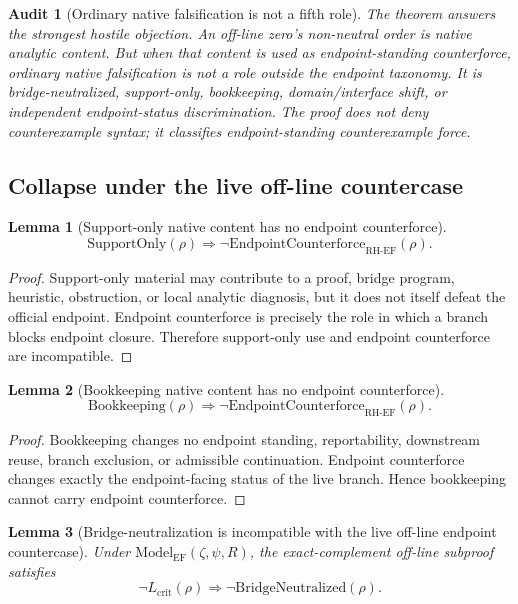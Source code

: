 \documentclass[11pt]{article}
\newtheorem{lemma}{Lemma}[section]
\newtheorem{audit}{Audit}[section]
\newcommand{\Lcrit}{L_{\mathrm{crit}}}
\newcommand{\RH}{\mathrm{RH}}
\newcommand{\EF}{\mathrm{EF}}
\newcommand{\ModelEF}{\mathrm{Model}_{\mathrm{EF}}}
\newcommand{\Counterforce}{\mathrm{EndpointCounterforce}}
\newcommand{\Book}{\mathrm{Bookkeeping}}
\newcommand{\Support}{\mathrm{SupportOnly}}
\newcommand{\BridgeNeutralized}{\mathrm{BridgeNeutralized}}
\begin{document}
\begin{audit}[Ordinary native falsification is not a fifth role]
The theorem answers the strongest hostile objection.  An off-line zero's non-neutral order is native analytic content.  But when that content is used as endpoint-standing counterforce, ordinary native falsification is not a role outside the endpoint taxonomy.  It is bridge-neutralized, support-only, bookkeeping, domain/interface shift, or independent endpoint-status discrimination.  The proof does not deny counterexample syntax; it classifies endpoint-standing counterexample force.
\end{audit}

\subsection{Collapse under the live off-line countercase}

\begin{lemma}[Support-only native content has no endpoint counterforce]
\[
\Support(\rho)\Rightarrow \neg\Counterforce_{\RH\text{-}\EF}(\rho).
\]
\end{lemma}

\begin{proof}
Support-only material may contribute to a proof, bridge program, heuristic, obstruction, or local analytic diagnosis, but it does not itself defeat the official endpoint.  Endpoint counterforce is precisely the role in which a branch blocks endpoint closure.  Therefore support-only use and endpoint counterforce are incompatible.
\end{proof}

\begin{lemma}[Bookkeeping native content has no endpoint counterforce]
\[
\Book(\rho)\Rightarrow \neg\Counterforce_{\RH\text{-}\EF}(\rho).
\]
\end{lemma}

\begin{proof}
Bookkeeping changes no endpoint standing, reportability, downstream reuse, branch exclusion, or admissible continuation.  Endpoint counterforce changes exactly the endpoint-facing status of the live branch.  Hence bookkeeping cannot carry endpoint counterforce.
\end{proof}

\begin{lemma}[Bridge-neutralization is incompatible with the live off-line endpoint countercase]
Under \(\ModelEF(\zeta,\psi,R)\), the exact-complement off-line subproof satisfies
\[
\neg\Lcrit(\rho)\Rightarrow \neg\BridgeNeutralized(\rho).
\]
\end{lemma}
\end{document}

